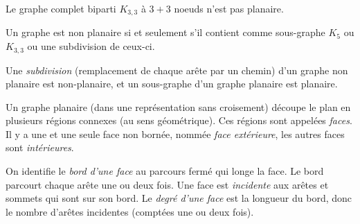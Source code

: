 \begin{mytheo}
Le graphe complet biparti $K_{3,3}$ à $3+3$ noeuds n'est pas planaire.
\end{mytheo}



\begin{mytheo} [Kuratowski]
  Un graphe est non planaire si et seulement s'il contient comme sous-graphe $K_5$ ou $K_{3,3}$ ou une subdivision de ceux-ci.
\end{mytheo}


\begin{mydef}
  Une \emph{subdivision} (remplacement de chaque arête par un chemin) d'un graphe non planaire est non-planaire, et un sous-graphe d'un graphe planaire est planaire.
\end{mydef}

\begin{mydef}
  Un graphe planaire (dans une représentation sans croisement) découpe le plan en plusieurs régions connexes (au sens géométrique). Ces régions sont appelées \emph{faces}. Il y a une et une seule face non bornée, nommée \emph{face extérieure}, les autres faces sont \emph{intérieures}.
\end{mydef}

\begin{mydef}
  On identifie le \emph{bord d'une face} au parcours fermé qui longe la face. Le bord parcourt chaque arête une ou deux fois.
  Une face est \emph{incidente} aux arêtes et sommets qui sont sur son bord.
  Le \emph{degré d'une face} est la longueur du bord, donc le nombre d'arêtes incidentes (comptées une ou deux fois).
\end{mydef}

